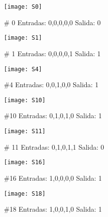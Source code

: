 \documentclass[a4paper,12pt]{article}
\begin{document}
\begin{figure}[ht!]
	\centering

	\texttt{[image: S0]}

	\caption{\# 0 Entradas: 0,0,0,0,0 Salida: 0}
\end{figure}

\vspace{.5cm}

\begin{figure}[ht!]
	\centering

	\texttt{[image: S1]}

	\caption{\# 1 Entradas: 0,0,0,0,1 Salida: 1}
\end{figure}

\vspace{.5cm}

\begin{figure}[ht!]
	\centering

	\texttt{[image: S4]}

	\caption{\#4 Entradas: 0,0,1,0,0 Salida: 1}
\end{figure}

\vspace{.5cm}

\begin{figure}[ht!]
	\centering

	\texttt{[image: S10]}

	\caption{\#10 Entradas: 0,1,0,1,0 Salida: 1}
\end{figure}

\vspace{.5cm}

\begin{figure}[ht!]
	\centering

	\texttt{[image: S11]}

	\caption{\# 11 Entradas: 0,1,0,1,1 Salida: 0}
\end{figure}

\vspace{.5cm}

\begin{figure}[ht!]
	\centering

	\texttt{[image: S16]}

	\caption{\#16 Entradas: 1,0,0,0,0 Salida: 1}
\end{figure}

\vspace{.5cm}

\begin{figure}[ht!]
	\centering

	\texttt{[image: S18]}

	\caption{\#18 Entradas: 1,0,0,1,0 Salida: 1}
\end{figure}
\end{document}
